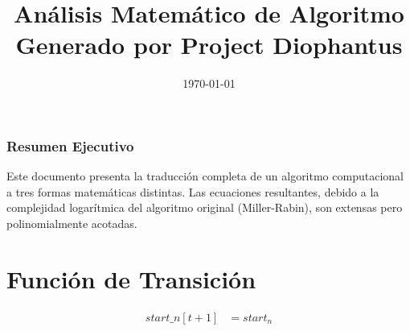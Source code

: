 \documentclass[10pt, a4paper]{article}
\title{Análisis Matemático de Algoritmo \\ \large Generado por Project Diophantus}
\author{}
\date{\today}
\begin{document}
\maketitle
\section*{Resumen Ejecutivo}
Este documento presenta la traducción completa de un algoritmo computacional a tres formas matemáticas distintas.
Las ecuaciones resultantes, debido a la complejidad logarítmica del algoritmo original (Miller-Rabin), son extensas pero polinomialmente acotadas.
\part{Función de Transición}
\begin{align*}
start\_n[t+1] &= start_n \\

\end{align*}
\end{document}
